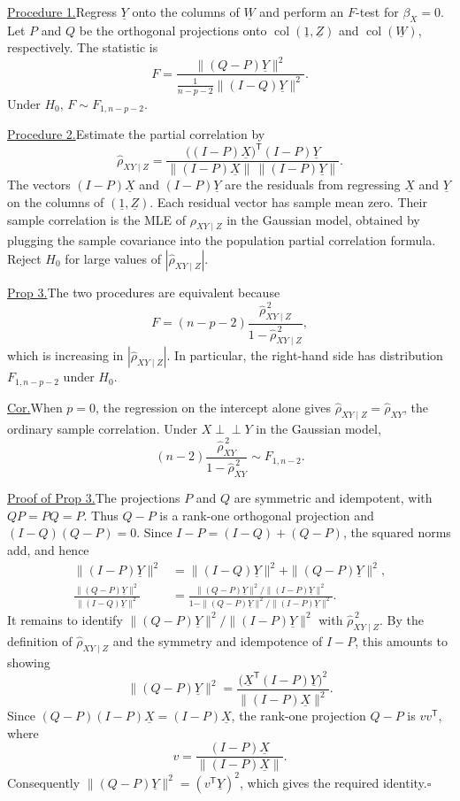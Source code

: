 \documentclass[11pt,a4paper]{article}
\begin{document}
\medskip
\noindent\underline{Procedure 1.}\quad Regress $\underline Y$ onto the
columns of $\underline W$ and perform an $F$-test for $\beta_X=0$.
Let $P$ and $Q$ be the orthogonal projections onto
$\operatorname{col}(\underline 1,\underline Z)$ and
$\operatorname{col}(\underline W)$, respectively. The statistic is
\[
F=\frac{\|(Q-P)\underline Y\|^2}
        {\frac{1}{n-p-2}\|(I-Q)\underline Y\|^2}.
\]
Under $H_0$, $F\sim F_{1,n-p-2}$.

\medskip
\noindent\underline{Procedure 2.}\quad Estimate the partial correlation by
\[
\hat\rho_{XY\mid Z}
=\frac{\bigl((I-P)\underline X\bigr)^{\mathsf T}(I-P)\underline Y}
        {\|(I-P)\underline X\|\,\|(I-P)\underline Y\|}.
\]
The vectors $(I-P)\underline X$ and $(I-P)\underline Y$ are the residuals
from regressing $\underline X$ and $\underline Y$ on the columns of
$(\underline 1,\underline Z)$. Each residual vector has sample mean zero.
Their sample correlation is the MLE of $\rho_{XY\mid Z}$ in the Gaussian
model, obtained by plugging the sample covariance into the population
partial correlation formula. Reject $H_0$ for large values of
$|\hat\rho_{XY\mid Z}|$.

\medskip
\noindent\underline{Prop 3.}\quad The two procedures are equivalent because
\[
F=(n-p-2)\frac{\hat\rho_{XY\mid Z}^{\,2}}
                  {1-\hat\rho_{XY\mid Z}^{\,2}},
\]
which is increasing in $|\hat\rho_{XY\mid Z}|$. In particular, the
right-hand side has distribution $F_{1,n-p-2}$ under $H_0$.

\medskip
\noindent\underline{Cor.}\quad When $p=0$, the regression on the
intercept alone gives $\hat\rho_{XY\mid Z}=\hat\rho_{XY}$, the ordinary
sample correlation. Under $X\perp\!\!\!\perp Y$ in the Gaussian model,
\[
(n-2)\frac{\hat\rho_{XY}^{\,2}}{1-\hat\rho_{XY}^{\,2}}\sim F_{1,n-2}.
\]

\noindent\underline{Proof of Prop 3.}\quad The projections $P$ and $Q$
are symmetric and idempotent, with $QP=PQ=P$. Thus $Q-P$ is a
rank-one orthogonal projection and $(I-Q)(Q-P)=0$. Since
$I-P=(I-Q)+(Q-P)$, the squared norms add, and hence
\[
\begin{aligned}
\|(I-P)\underline Y\|^2
&=\|(I-Q)\underline Y\|^2+\|(Q-P)\underline Y\|^2,\\
\frac{\|(Q-P)\underline Y\|^2}{\|(I-Q)\underline Y\|^2}
&=\frac{\|(Q-P)\underline Y\|^2/\|(I-P)\underline Y\|^2}
        {1-\|(Q-P)\underline Y\|^2/\|(I-P)\underline Y\|^2}.
\end{aligned}
\]
It remains to identify $\|(Q-P)\underline Y\|^2/\|(I-P)\underline Y\|^2$
with $\hat\rho_{XY\mid Z}^{\,2}$. By the definition of
$\hat\rho_{XY\mid Z}$ and the symmetry and idempotence of $I-P$, this
amounts to showing
\[
\|(Q-P)\underline Y\|^2
=\frac{\bigl(\underline X^{\mathsf T}(I-P)\underline Y\bigr)^2}
        {\|(I-P)\underline X\|^2}.
\]
Since $(Q-P)(I-P)\underline X=(I-P)\underline X$, the rank-one
projection $Q-P$ is $vv^{\mathsf T}$, where
\[
v=\frac{(I-P)\underline X}{\|(I-P)\underline X\|}.
\]
Consequently $\|(Q-P)\underline Y\|^2=(v^{\mathsf T}\underline Y)^2$,
which gives the required identity.\hfill$\square$
\end{document}
